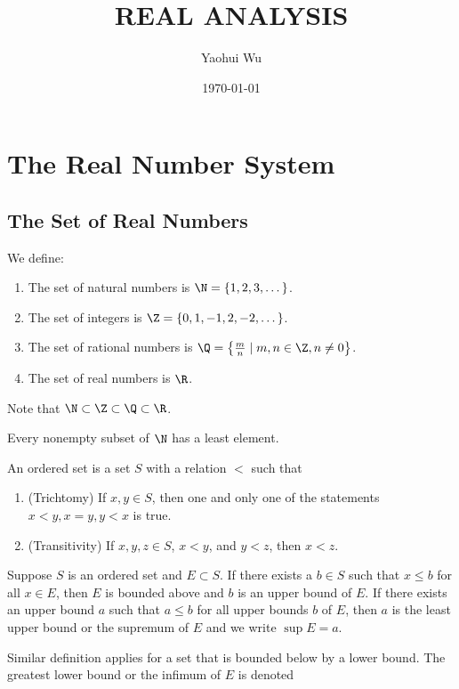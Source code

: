 \documentclass[12pt]{article}
\title{REAL ANALYSIS}
\author{Yaohui Wu}
\date{\today}
\begin{document}
\maketitle

\section{The Real Number System}
\subsection{The Set of Real Numbers}
We define:
\begin{enumerate}
    \item The set of natural numbers is \(\N=\{1,2,3,\dots\}\).
    \item The set of integers is \(\Z=\{0,1,-1,2,-2,\dots\}\).
    \item The set of rational numbers is
    \(\Q=\left\{\frac{m}{n}\mid m,n\in\Z,n\neq0\right\}\).
    \item The set of real numbers is \(\R\).
\end{enumerate}
Note that \(\N\subset\Z\subset\Q\subset\R\).
\begin{definition}
    Every nonempty subset of \(\N\) has a least element.
\end{definition}
\begin{definition}
    An ordered set is a set \(S\) with a relation \(<\) such that
    \begin{enumerate}
        \item (Trichtomy) If \(x,y\in S\), then one and only one of
        the statements \(x<y,x=y,y<x\) is true.
        \item (Transitivity) If \(x,y,z\in S\), \(x<y\), and \(y<z\),
        then \(x<z\).
    \end{enumerate}
\end{definition}
\begin{definition}
    Suppose \(S\) is an ordered set and \(E\subset S\).
    If there exists a \(b\in S\) such that \(x\leq b\) for all \(x\in E\),
    then \(E\) is bounded above and \(b\) is an upper bound
    of \(E\).
    If there exists an upper bound \(a\) such that \(a\leq b\) for all upper
    bounds \(b\) of \(E\), then \(a\) is the least upper bound or the
    supremum of \(E\) and we write \(\sup E=a\).
\end{definition}
Similar definition applies for a set that is bounded below by a
lower bound.
The greatest lower bound or the infimum of \(E\) is denoted
\end{document}

